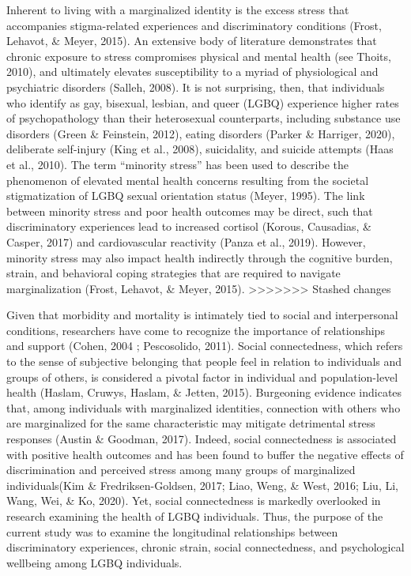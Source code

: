 \documentclass[
  english,
  man,floatsintext]{apa6}
\begin{document}
Inherent to living with a marginalized identity is the excess stress that accompanies stigma-related experiences and discriminatory conditions (Frost, Lehavot, \& Meyer, 2015). An extensive body of literature demonstrates that chronic exposure to stress compromises physical and mental health (see Thoits, 2010), and ultimately elevates susceptibility to a myriad of physiological and psychiatric disorders (Salleh, 2008). It is not surprising, then, that individuals who identify as gay, bisexual, lesbian, and queer (LGBQ) experience higher rates of psychopathology than their heterosexual counterparts, including substance use disorders (Green \& Feinstein, 2012), eating disorders (Parker \& Harriger, 2020), deliberate self-injury (King et al., 2008), suicidality, and suicide attempts (Haas et al., 2010). The term ``minority stress'' has been used to describe the phenomenon of elevated mental health concerns resulting from the societal stigmatization of LGBQ sexual orientation status (Meyer, 1995). The link between minority stress and poor health outcomes may be direct, such that discriminatory experiences lead to increased cortisol (Korous, Causadias, \& Casper, 2017) and cardiovascular reactivity (Panza et al., 2019). However, minority stress may also impact health indirectly through the cognitive burden, strain, and behavioral coping strategies that are required to navigate marginalization (Frost, Lehavot, \& Meyer, 2015).
>>>>>>> Stashed changes

Given that morbidity and mortality is intimately tied to social and interpersonal conditions, researchers have come to recognize the importance of relationships and support (Cohen, 2004 ; Pescosolido, 2011). Social connectedness, which refers to the sense of subjective belonging that people feel in relation to individuals and groups of others, is considered a pivotal factor in individual and population-level health (Haslam, Cruwys, Haslam, \& Jetten, 2015). Burgeoning evidence indicates that, among individuals with marginalized identities, connection with others who are marginalized for the same characteristic may mitigate detrimental stress responses (Austin \& Goodman, 2017). Indeed, social connectedness is associated with positive health outcomes and has been found to buffer the negative effects of discrimination and perceived stress among many groups of marginalized individuals(Kim \& Fredriksen-Goldsen, 2017; Liao, Weng, \& West, 2016; Liu, Li, Wang, Wei, \& Ko, 2020). Yet, social connectedness is markedly overlooked in research examining the health of LGBQ individuals. Thus, the purpose of the current study was to examine the longitudinal relationships between discriminatory experiences, chronic strain, social connectedness, and psychological wellbeing among LGBQ individuals.
\end{document}
